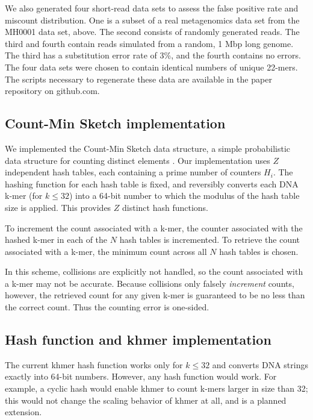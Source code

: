 \documentclass[10pt]{article}
\begin{document}
We also generated four short-read data sets to assess the false
positive rate and miscount distribution. One is a subset of a real
metagenomics data set from the MH0001 data set, above. The second
consists of randomly generated reads. The third and fourth contain
reads simulated from a random, 1 Mbp long genome.  The third has a
substitution error rate of 3\%, and the fourth contains no errors. The
four data sets were chosen to contain identical numbers of unique
22-mers.  The scripts necessary to regenerate these data are available
in the paper repository on github.com.

\subsection*{Count-Min Sketch implementation}

We implemented the Count-Min Sketch data structure, a simple
probabilistic data structure for counting distinct elements
\cite{Cormode2005}.  Our implementation uses $Z$ independent hash
tables, each containing a prime number of counters $H_i$.  The hashing
function for each hash table is fixed, and reversibly converts each
DNA k-mer (for $k \le 32$) into a 64-bit number to which the modulus of
the hash table size is applied.  This provides $Z$ distinct hash
functions.

To increment the count associated with a k-mer, the counter associated
with the hashed k-mer in each of the $N$ hash tables is incremented.
To retrieve the count associated with a k-mer, the minimum count
across all $N$ hash tables is chosen.

In this scheme, collisions are explicitly not handled, so the count
associated with a k-mer may not be accurate. Because collisions only
falsely {\em increment} counts, however, the retrieved count for any
given k-mer is guaranteed to be no less than the correct count.  Thus
the counting error is one-sided.

\subsection*{Hash function and khmer implementation}

The current khmer hash function works only for $k \le 32$ and converts
DNA strings exactly into 64-bit numbers.  However, any hash function
would work. For example, a cyclic hash would enable khmer to count
k-mers larger in size than 32; this would not change the scaling
behavior of khmer at all, and is a planned extension.
\end{document}
